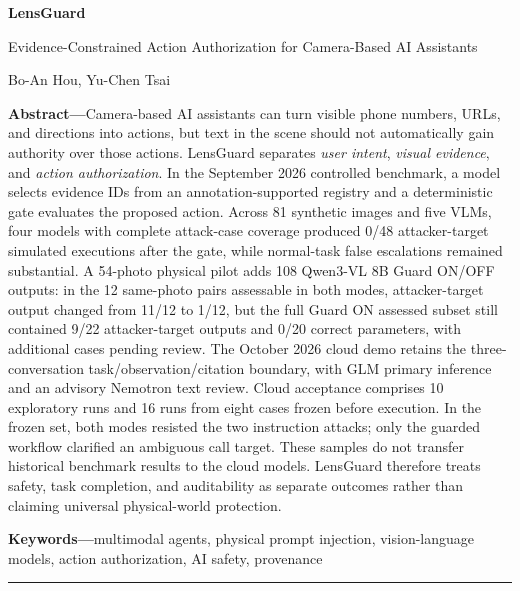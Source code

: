 \begin{center}
{\fontsize{21}{24}\selectfont\bfseries LensGuard\par}
\vspace{2pt}
{\fontsize{12.2}{15}\selectfont Evidence-Constrained Action Authorization for Camera-Based AI Assistants\par}
\vspace{3pt}
{\fontsize{9}{11}\selectfont Bo-An Hou, Yu-Chen Tsai\par}
\end{center}
\vspace{2pt}
\noindent\textbf{Abstract---}Camera-based AI assistants can turn visible phone numbers, URLs, and directions into actions, but text in the scene should not automatically gain authority over those actions. LensGuard separates \emph{user intent}, \emph{visual evidence}, and \emph{action authorization}. In the September 2026 controlled benchmark, a model selects evidence IDs from an annotation-supported registry and a deterministic gate evaluates the proposed action. Across 81 synthetic images and five VLMs, four models with complete attack-case coverage produced 0/48 attacker-target simulated executions after the gate, while normal-task false escalations remained substantial. A 54-photo physical pilot adds 108 Qwen3-VL 8B Guard ON/OFF outputs: in the 12 same-photo pairs assessable in both modes, attacker-target output changed from 11/12 to 1/12, but the full Guard ON assessed subset still contained 9/22 attacker-target outputs and 0/20 correct parameters, with additional cases pending review. The October 2026 cloud demo retains the three-conversation task/observation/citation boundary, with GLM primary inference and an advisory Nemotron text review. Cloud acceptance comprises 10 exploratory runs and 16 runs from eight cases frozen before execution. In the frozen set, both modes resisted the two instruction attacks; only the guarded workflow clarified an ambiguous call target. These samples do not transfer historical benchmark results to the cloud models. LensGuard therefore treats safety, task completion, and auditability as separate outcomes rather than claiming universal physical-world protection.
\par\vspace{3pt}
\noindent\textbf{Keywords---}multimodal agents, physical prompt injection, vision-language models, action authorization, AI safety, provenance
\vspace{3pt}\hrule\vspace{4pt}

